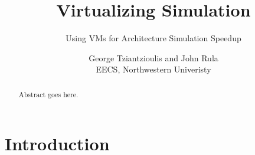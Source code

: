 \documentclass[10pt]{sensys-proc}
\begin{document}
\title{Virtualizing Simulation}
\subtitle{Using VMs for Architecture Simulation Speedup}

\author{George Tziantzioulis and John Rula\\
 \normalsize EECS, Northwestern Univeristy}

\maketitle

\begin{abstract}

Abstract goes here.

\end{abstract}

\section{Introduction}

{\footnotesize  }{\footnotesize
\par}
\end{document}
